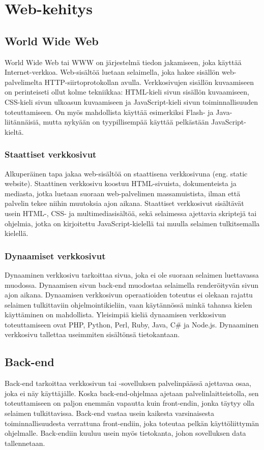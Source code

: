 \chapter{Web-kehitys}

\section{World Wide Web}
World Wide Web tai WWW on järjestelmä tiedon jakamiseen, joka käyttää Internet-verkkoa. Web-sisältöä luetaan selaimella,
joka hakee sisällön web-palvelimelta HTTP-siirtoprotokollan avulla. Verkkosivujen sisällön kuvaamiseen on perinteiseti
ollut kolme tekniikkaa: HTML-kieli sivun sisällön kuvaamiseen, CSS-kieli sivun ulkoasun kuvaamiseen ja JavaScript-kieli
sivun toiminnallisuuden toteuttamiseen. On myös mahdollista käyttää esimerkiksi Flash- ja Java-liitännäisiä, mutta
nykyään on tyypillisempää käyttää pelkästään JavaScript-kieltä. \cite{javascriptguide}

\subsection{Staattiset verkkosivut}
Alkuperäinen tapa jakaa web-sisältöä on staattisena verkkosivuna (eng. static website). Staattinen verkkosivu koostuu
HTML-sivuista, dokumenteista ja mediasta, jotka luetaan suoraan web-palvelimen massamuistista, ilman että palvelin tekee
niihin muutoksia ajon aikana. Staattiset verkkosivut sisältävät usein HTML-, CSS- ja multimediasisältöä, sekä selaimessa
ajettavia skriptejä tai ohjelmia, jotka on kirjoitettu JavaScript-kielellä tai muulla selaimen tulkitsemalla kielellä.
\cite{staticdynamicwebsites}

\subsection{Dynaamiset verkkosivut}
Dynaaminen verkkosivu tarkoittaa sivua, joka ei ole suoraan selaimen luettavassa muodossa. Dynaamisen sivun back-end
muodostaa selaimella renderöityvän sivun ajon aikana. Dynaamisen verkkosivun operaatioiden toteutus ei olekaan rajattu
selaimen tulkittaviin ohjelmointikieliin, vaan käytännössä minkä tahansa kielen käyttäminen on mahdollista. Yleisimpiä
kieliä dynaamisen verkkosivun toteuttamiseen ovat PHP, Python, Perl, Ruby, Java, C\# ja Node.js. Dynaaminen verkkosivu
tallettaa useimmiten sisältönsä tietokantaan. \cite{staticdynamicwebsites}

\section{Back-end}
Back-end tarkoittaa verkkosivun tai -sovelluksen palvelinpäässä ajettavaa osaa, joka ei näy käyttäjälle. Koska
back-end-ohjelmaa ajetaan palvelinlaitteistolla, sen toteuttamiseen on paljon enemmän vapautta kuin front-endin, jonka
täytyy olla selaimen tulkittavissa. Back-end vastaa usein kaikesta varsinaisesta toiminnallisuudesta verrattuna
front-endiin, joka toteutaa pelkän käyttöliittymän ohjelmalle. Back-endiin kuuluu usein myös tietokanta, johon
sovelluksen data tallennetaan. \cite{fullstackdeveloper}

